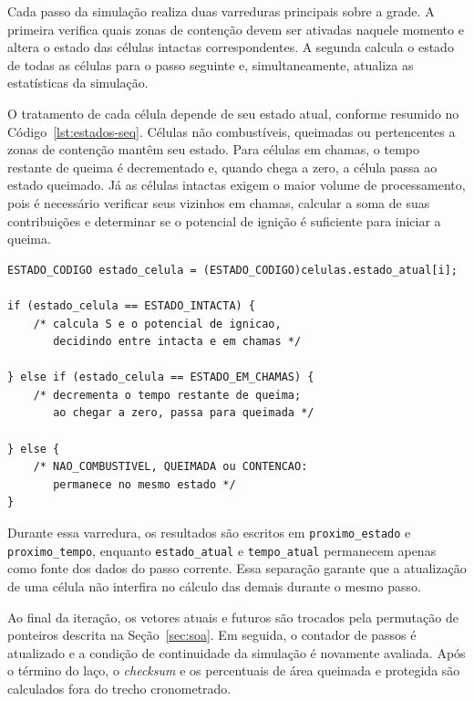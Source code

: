 \documentclass[11pt,a4paper]{article}
\begin{document}
Cada passo da simulação realiza duas varreduras principais sobre a grade. A primeira verifica quais zonas de contenção devem ser ativadas naquele momento e altera o estado das células intactas correspondentes. A segunda calcula o estado de todas as células para o passo seguinte e, simultaneamente, atualiza as estatísticas da simulação.

O tratamento de cada célula depende de seu estado atual, conforme resumido no Código~\ref{lst:estados-seq}. Células não combustíveis, queimadas ou pertencentes a zonas de contenção mantêm seu estado. Para células em chamas, o tempo restante de queima é decrementado e, quando chega a zero, a célula passa ao estado queimado. Já as células intactas exigem o maior volume de processamento, pois é necessário verificar seus vizinhos em chamas, calcular a soma de suas contribuições e determinar se o potencial de ignição é suficiente para iniciar a queima.

\begin{lstlisting}[caption={Estrutura da cadeia \texttt{if}/\texttt{else if} de atualização de estado em \texttt{fire\_seq.c}.},label={lst:estados-seq}]
ESTADO_CODIGO estado_celula = (ESTADO_CODIGO)celulas.estado_atual[i];

if (estado_celula == ESTADO_INTACTA) {
    /* calcula S e o potencial de ignicao,
       decidindo entre intacta e em chamas */

} else if (estado_celula == ESTADO_EM_CHAMAS) {
    /* decrementa o tempo restante de queima;
       ao chegar a zero, passa para queimada */

} else {
    /* NAO_COMBUSTIVEL, QUEIMADA ou CONTENCAO:
       permanece no mesmo estado */
}
\end{lstlisting}

Durante essa varredura, os resultados são escritos em \texttt{proximo\_estado} e \texttt{proximo\_tempo}, enquanto \texttt{estado\_atual} e \texttt{tempo\_atual} permanecem apenas como fonte dos dados do passo corrente. Essa separação garante que a atualização de uma célula não interfira no cálculo das demais durante o mesmo passo.

Ao final da iteração, os vetores atuais e futuros são trocados pela permutação de ponteiros descrita na Seção~\ref{sec:soa}. Em seguida, o contador de passos é atualizado e a condição de continuidade da simulação é novamente avaliada. Após o término do laço, o \emph{checksum} e os percentuais de área queimada e protegida são calculados fora do trecho cronometrado.
\end{document}
